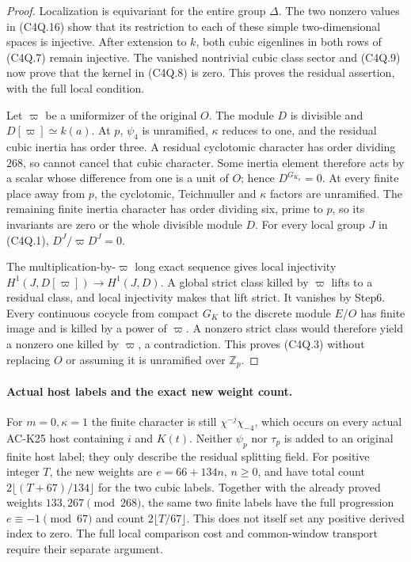 \begin{proof}
Localization is equivariant for the entire group $\Delta$.
The two nonzero values in (C4Q.16) show that its restriction to
each of these simple two-dimensional spaces is injective.
After extension to $k$, both cubic eigenlines in both rows of
(C4Q.7) remain injective.
The vanished nontrivial cubic class sector and (C4Q.9) now prove
that the kernel in (C4Q.8) is zero.
This proves the residual assertion, with the full local condition.

Let $\varpi$ be a uniformizer of the original $O$.
The module $D$ is divisible and $D[\varpi]\simeq k(a)$.
At $p$, $\psi_4$ is unramified, $\kappa$ reduces to one,
and the residual cubic inertia has order three.
A residual cyclotomic character has order dividing $268$,
so cannot cancel that cubic character.
Some inertia element therefore acts by a scalar whose difference
from one is a unit of $O$; hence $D^{G_{K_p}}=0$.
At every finite place away from $p$, the cyclotomic, Teichmuller
and $\kappa$ factors are unramified.
The remaining finite inertia character has order dividing six,
prime to $p$, so its invariants are zero or the whole divisible
module $D$.
For every local group $J$ in (C4Q.1),
$D^J/\varpi D^J=0$.

The multiplication-by-$\varpi$ long exact sequence gives local
injectivity $H^1(J,D[\varpi])\to H^1(J,D)$.
A global strict class killed by $\varpi$ lifts to a residual
class, and local injectivity makes that lift strict.
It vanishes by Step6.
Every continuous cocycle from compact $G_K$ to the discrete
module $E/O$ has finite image and is killed by a power of
$\varpi$.  A nonzero strict class would therefore yield a
nonzero one killed by $\varpi$, a contradiction.
This proves (C4Q.3) without replacing $O$ or assuming it is
unramified over $\mathbb Z_p$.
\end{proof}

\paragraph{Actual host labels and the exact new weight count.}
For $m=0,\kappa=1$ the finite character is still
$\chi^{-j}\chi_{-4}$, which occurs on every actual AC-K25 host
containing $i$ and $K(t)$.
Neither $\psi_p$ nor $\tau_p$ is added to an original finite
host label; they only describe the residual splitting field.
For positive integer $T$, the new weights are $e=66+134n$,
$n\geq0$, and have total count
$2\lfloor(T+67)/134\rfloor$ for the two cubic labels.
Together with the already proved weights $133,267\pmod{268}$,
the same two finite labels have the full progression
$e\equiv-1\pmod{67}$ and count $2\lfloor T/67\rfloor$.
This does not itself set any positive derived index to zero.
The full local comparison cost and common-window transport
require their separate argument.

